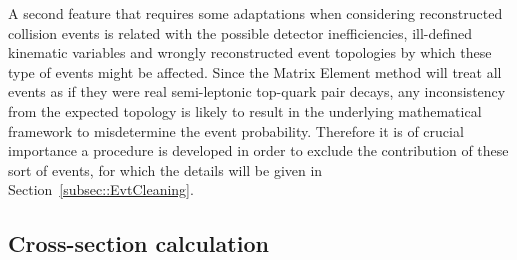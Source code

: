 A second feature that requires some adaptations when considering reconstructed collision events is related with the possible detector inefficiencies, ill-defined kinematic variables and wrongly reconstructed event topologies by which these type of events might be affected.
Since the Matrix Element method will treat all events as if they were real semi-leptonic top-quark pair decays, any inconsistency from the expected topology is likely to result in the underlying mathematical framework to misdetermine the event probability.
Therefore it is of crucial importance a procedure is developed in order to exclude the contribution of these sort of events, for which the details will be given in Section~\ref{subsec::EvtCleaning}.


\subsection{Cross-section calculation} \label{subsec::XSReco}

